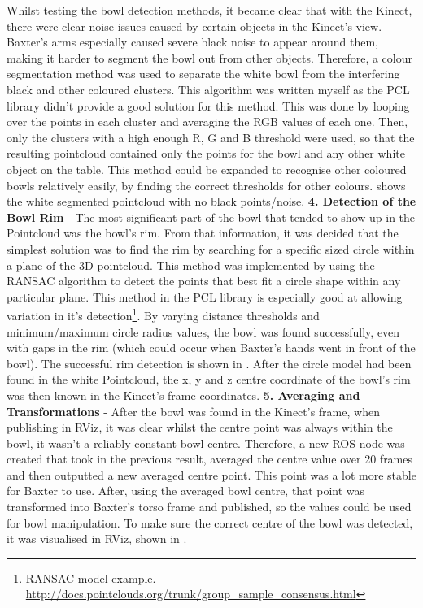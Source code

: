 Whilst testing the bowl detection methods, it became clear that with the Kinect, there were clear noise issues caused by certain objects in the Kinect's view. Baxter's arms especially caused severe black noise to appear around them, making it harder to segment the bowl out from other objects. Therefore, a colour segmentation method was used to separate the white bowl from the interfering black and other coloured clusters. This algorithm was written myself as the PCL library didn't provide a good solution for this method. This was done by looping over the points in each cluster and averaging the RGB values of each one. Then, only the clusters with a high enough R, G and B threshold were used, so that the resulting pointcloud contained only the points for the bowl and any other white object on the table. This method could be expanded to recognise other coloured bowls relatively easily, by finding the correct thresholds for other colours. \textbf{} shows the white segmented pointcloud with no black points/noise.
\newline\newline
\textbf{4. Detection of the Bowl Rim} - 
The most significant part of the bowl that tended to show up in the Pointcloud was the bowl's rim. From that information, it was decided that the simplest solution was to find the rim by searching for a specific sized circle within a plane of the 3D pointcloud. This method was implemented by using the RANSAC algorithm to detect the points that best fit a circle shape within any particular plane. This method in the PCL library is especially good at allowing variation in it's detection\footnote{RANSAC model example. \url{http://docs.pointclouds.org/trunk/group_sample_consensus.html}}. By varying distance thresholds and minimum/maximum circle radius values, the bowl was found successfully, even with gaps in the rim (which could occur when Baxter's hands went in front of the bowl). The successful rim detection is shown in \textbf{}. After the circle model had been found in the white Pointcloud, the x, y and z centre coordinate of the bowl's rim was then known in the Kinect's frame coordinates.
\newline\newline
\textbf{5. Averaging and Transformations} - 
After the bowl was found in the Kinect's frame, when publishing in RViz, it was clear  whilst the centre point was always within the bowl, it wasn't a reliably constant bowl centre. Therefore, a new ROS node was created that took in the previous result, averaged the centre value over 20 frames and then outputted a new averaged centre point. This point was a lot more stable for Baxter to use. After, using the averaged bowl centre, that point was transformed into Baxter's torso frame and published, so the values could be used for bowl manipulation. To make sure the correct centre of the bowl was detected, it was visualised in RViz, shown in \textbf{}.
